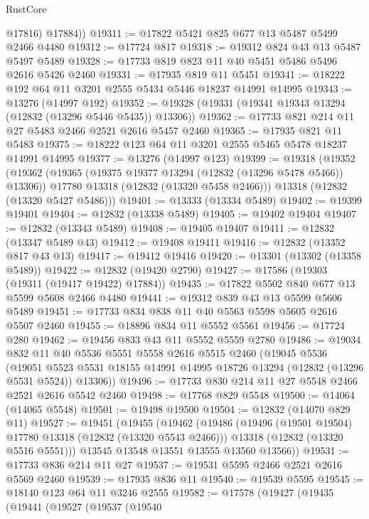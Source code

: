 \begin{lexlean}{RustCore}
\begin{coremodule}
          @17816)
        @17884))
@19311 := @17822 @5421 @825 @677 @13 @5487 @5499 @2466 @4480
@19312 := @17724 @817
@19318 := @19312 @824 @43 @13 @5487 @5497 @5489
@19328 := @17733 @819 @823 @11 @40 @5451 @5486 @5496 @2616 @5426 @2460
@19331 := @17935 @819 @11 @5451
@19341 := @18222 @192 @64 @11 @3201 @2555 @5434 @5446 @18237 @14991 @14995
@19343 := @13276 (@14997 @192)
@19352 := @19328 (@19331 (@19341 @19343 @13294 (@12832 (@13296 @5446 @5435)) @13306))
@19362 := @17733 @821 @214 @11 @27 @5483 @2466 @2521 @2616 @5457 @2460
@19365 := @17935 @821 @11 @5483
@19375 := @18222 @123 @64 @11 @3201 @2555 @5465 @5478 @18237 @14991 @14995
@19377 := @13276 (@14997 @123)
@19399 := @19318
    (@19352
      (@19362
        (@19365 (@19375 @19377 @13294 (@12832 (@13296 @5478 @5466)) @13306))
        @17780
        @13318
        (@12832 (@13320 @5458 @2466)))
      @13318
      (@12832 (@13320 @5427 @5486)))
@19401 := @13333 (@13334 @5489)
@19402 := @19399 @19401
@19404 := @12832 (@13338 @5489)
@19405 := @19402 @19404
@19407 := @12832 (@13343 @5489)
@19408 := @19405 @19407
@19411 := @12832 (@13347 @5489 @43)
@19412 := @19408 @19411
@19416 := @12832 (@13352 @817 @43 @13)
@19417 := @19412 @19416
@19420 := @13301 (@13302 (@13358 @5489))
@19422 := @12832 (@19420 @2790)
@19427 := @17586 (@19303 (@19311 (@19417 @19422) @17884))
@19435 := @17822 @5502 @840 @677 @13 @5599 @5608 @2466 @4480
@19441 := @19312 @839 @43 @13 @5599 @5606 @5489
@19451 := @17733 @834 @838 @11 @40 @5563 @5598 @5605 @2616 @5507 @2460
@19455 := @18896 @834 @11 @5552 @5561
@19456 := @17724 @280
@19462 := @19456 @833 @43 @11 @5552 @5559 @2780
@19486 := @19034
    @832
    @11
    @40
    @5536
    @5551
    @5558
    @2616
    @5515
    @2460
    (@19045
      @5536
      (@19051 @5523 @5531 @18155 @14991 @14995 @18726 @13294 (@12832 (@13296 @5531 @5524)) @13306))
@19496 := @17733 @830 @214 @11 @27 @5548 @2466 @2521 @2616 @5542 @2460
@19498 := @17768 @829 @5548
@19500 := @14064 (@14065 @5548)
@19501 := @19498 @19500
@19504 := @12832 (@14070 @829 @11)
@19527 := @19451
    (@19455
      (@19462
        (@19486
          (@19496 (@19501 @19504) @17780 @13318 (@12832 (@13320 @5543 @2466)))
          @13318
          (@12832 (@13320 @5516 @5551)))
        @13545
        @13548
        @13551
        @13555
        @13560
        @13566))
@19531 := @17733 @836 @214 @11 @27
@19537 := @19531 @5595 @2466 @2521 @2616 @5569 @2460
@19539 := @17935 @836 @11
@19540 := @19539 @5595
@19545 := @18140 @123 @64 @11 @3246 @2555
@19582 := @17578
    (@19427
      (@19435
        (@19441
          (@19527
            (@19537
              (@19540

\end{coremodule}
\end{lexlean}
